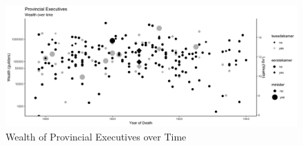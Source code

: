 \begin{landscape}

\clearpage


\begin{figure}
    \centering
    \includegraphics[scale = 0.17]{figures/wealth_dep.png}
    \caption{Wealth of Provincial Executives over Time}
    \label{fig:avgwealthprovexec}
\end{figure}
\clearpage
\end{landscape}




